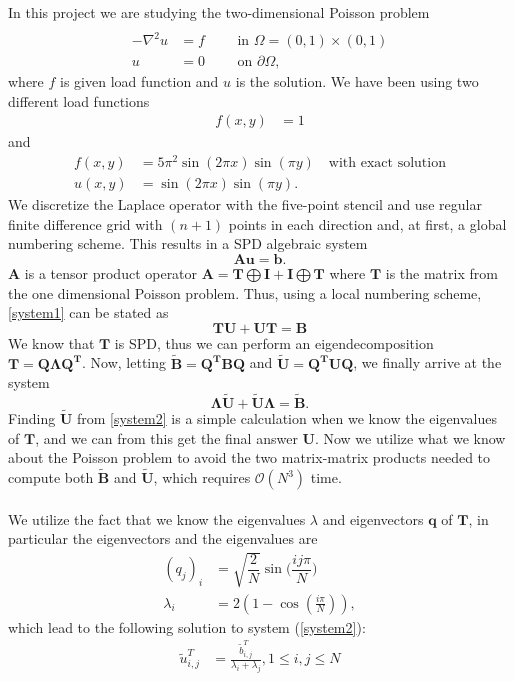 In this project we are studying the two-dimensional Poisson problem
\begin{align}\\
\label{Poisson}
-\nabla^2u&=f \quad\quad\text{ in } \Omega=(0,1)\times(0,1)\\
u&=0 \quad\quad\text{ on } \partial \Omega, \nonumber
\end{align}
where $f$ is given load function and $u$ is the solution. We have been using two different load functions
\begin{align*}
f(x,y)&=1
\end{align*}
and
\begin{align}
\label{loadfunc2}
f(x,y)&=5\pi^2\sin(2\pi x)\sin(\pi y) \quad\text{with exact solution} \\
u(x,y)&=\sin(2\pi x)\sin(\pi y).\nonumber
\end{align}
We discretize the Laplace operator with the five-point stencil and use regular finite difference grid with $(n+1)$ points in each direction and, at first, a global numbering scheme. This results in a SPD algebraic system
\begin{equation}
	\mathbf{Au} = \mathbf{b}.
	\label{system1}
\end{equation}
$\mathbf{A}$ is a tensor product operator $\mathbf{A} = \mathbf{T}\bigoplus\mathbf{I} + \mathbf{I}\bigoplus\mathbf{T}$ where $\mathbf{T}$ is the matrix from the one dimensional Poisson problem. Thus, using a local numbering scheme, \eqref{system1} can be stated as 
\begin{equation}
	\mathbf{TU} + \mathbf{UT} = \mathbf{B}
\end{equation}
We know that $\mathbf{T}$ is SPD, thus we can perform an eigendecomposition $\mathbf{T} = \mathbf{Q\Lambda Q^T}$. Now, letting $\mathbf{\widetilde{B}} = \mathbf{Q^TBQ}$ and $\mathbf{\widetilde{U}} = \mathbf{Q^TUQ}$, we finally arrive at the system 
\begin{equation}
	\mathbf{\Lambda\widetilde{U}} + \mathbf{\widetilde{U}\Lambda} = \mathbf{\widetilde{B}}.
	\label{system2}
\end{equation}
Finding $\mathbf{\widetilde{U}}$ from \eqref{system2} is a simple calculation when we know the eigenvalues of $\mathbf{T}$, and we can from this get the final answer $\mathbf{U}$. Now we utilize what we know about the Poisson problem to avoid the two matrix-matrix products needed to compute both $\mathbf{\widetilde{B}}$ and $\mathbf{\widetilde{U}}$, which requires $\mathcal{O}(N^3)$ time. \\
\\
We utilize the fact that we know the eigenvalues $\lambda$ and eigenvectors $\mathbf{q}$ of $\mathbf{T}$, in particular the eigenvectors and the eigenvalues are
\begin{align*}
	(q_j)_i &= \sqrt{\dfrac{2}{N}}\sin \Big( \dfrac{ij\pi}{N}\Big) \\
	\lambda_i &= 2\left(1-\cos\left(\frac{i \pi}{N}\right) \right),
\end{align*}
which lead to the following solution to system (\ref{system2}):
\begin{align*}
\tilde{u}^T_{i,j} &= \frac{\tilde{b}^T_{i,j}}{\lambda_i + \lambda_j}, 1 \leq i, j \leq N
\end{align*}

